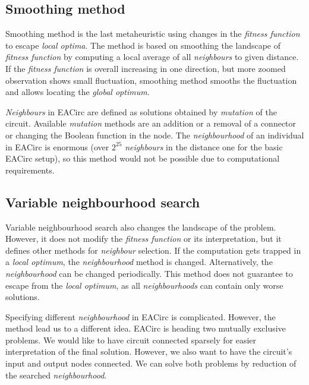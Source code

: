 \documentclass[
    digital,    %
    oneside,    %
    color,
    11pt,
    nocover,
    notable,
    nolof,
    nolot,
]{fithesis3}
\begin{document}
\subsection{Smoothing method}
\label{subsec:opt-single-sol-smooth}

Smoothing method is the last metaheuristic using changes in the \textit{fitness function} to escape \textit{local optima}. The method is based on smoothing the landscape of \textit{fitness function} by computing a local average of all \textit{neighbours} to given distance. If the \textit{fitness function} is overall increasing in one direction, but more zoomed observation shows small fluctuation, smoothing method smooths the fluctuation and allows locating the \textit{global optimum}.

\textit{Neighbours} in EACirc are defined as solutions obtained by \textit{mutation} of the circuit. Available \textit{mutation} methods are an addition or a removal of a connector or changing the Boolean function in the node. The \textit{neighbourhood} of an individual in EACirc is enormous (over $2^{25}$ \textit{neighbours} in the distance one for the basic EACirc setup), so this method would not be possible due to computational requirements.

\subsection{Variable neighbourhood search}
\label{subsec:opt-single-sol-vns}

Variable neighbourhood search also changes the landscape of the problem. However, it does not modify the \textit{fitness function} or its interpretation, but it defines other methods for \textit{neighbour} selection. If the computation gets trapped in a \textit{local optimum}, the \textit{neighbourhood} method is changed. Alternatively, the \textit{neighbourhood} can be changed periodically. This method does not guarantee to escape from the \textit{local optimum}, as all \textit{neighbourhoods} can contain only worse solutions.

Specifying different \textit{neighbourhood} in EACirc is complicated. However, the method lead us to a different idea. EACirc is heading two mutually exclusive problems. We would like to have circuit connected sparsely for easier interpretation of the final solution. However, we also want to have the circuit's input and output nodes connected. We can solve both problems by reduction of the searched \textit{neighbourhood}.
\end{document}

